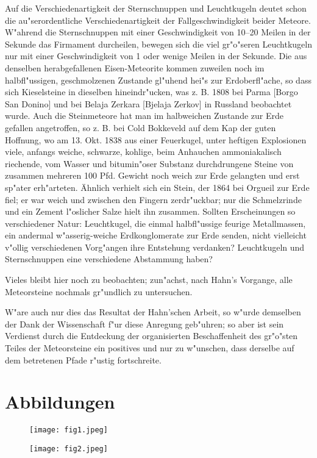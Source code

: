\documentclass[a4paper, 11pt, oneside]{article}
\begin{document}
Auf die Verschiedenartigkeit der Sternschnuppen und Leuchtkugeln deutet schon die au"serordentliche Verschiedenartigkeit der Fallgeschwindigkeit beider Meteore. W"ahrend die Sternschnuppen mit einer Geschwindigkeit von 10--20 Meilen in der Sekunde das Firmament durcheilen, bewegen sich die viel gr"o"seren Leuchtkugeln nur mit einer Geschwindigkeit von 1 oder wenige Meilen in der Sekunde. Die aus denselben herabgefallenen Eisen-Meteorite kommen zuweilen noch im halbfl"ussigen, geschmolzenen Zustande gl"uhend hei"s zur Erdoberfl"ache, so dass sich Kieselsteine in dieselben hineindr"ucken, was z. B. 1808 bei Parma [Borgo San Donino] und bei Belaja Zerkara [Bjelaja Zerkov] in Russland beobachtet wurde. Auch die Steinmeteore hat man im halbweichen Zustande zur Erde gefallen angetroffen, so z. B. bei Cold Bokkeveld auf dem Kap der guten Hoffnung, wo am 13. Okt. 1838 aus einer Feuerkugel, unter heftigen Explosionen viele, anfangs weiche, schwarze, kohlige, beim Anhauchen ammoniakalisch riechende, vom Wasser und bitumin"oser Substanz durchdrungene Steine von zusammen mehreren 100 Pfd. Gewicht noch weich zur Erde gelangten und erst sp"ater erh"arteten. Ähnlich verhielt sich ein Stein, der 1864 bei Orgueil zur Erde fiel; er war weich und zwischen den Fingern zerdr"uckbar; nur die Schmelzrinde und ein Zement l"oslicher Salze hielt ihn zusammen. Sollten Erscheinungen so verschiedener Natur: Leuchtkugel, die einmal halbfl"ussige feurige Metallmassen, ein andermal w"asserig-weiche Erdkonglomerate zur Erde senden, nicht vielleicht v"ollig verschiedenen Vorg"angen ihre Entstehung verdanken? Leuchtkugeln und Sternschnuppen eine verschiedene Abstammung haben?

Vieles bleibt hier noch zu beobachten; zun"achst, nach Hahn's Vorgange, alle Meteorsteine nochmals gr"undlich zu untersuchen.

W"are auch nur dies das Resultat der Hahn'schen Arbeit, so w"urde demselben der Dank der Wissenschaft f"ur diese Anregung geb"uhren; so aber ist sein Verdienst durch die Entdeckung der organisierten Beschaffenheit des gr"o"sten Teiles der Meteorsteine ein positives und nur zu w"unschen, dass derselbe auf dem betretenen Pfade r"ustig fortschreite.
\clearpage
\section{Abbildungen}
\clearpage
\pagestyle{fancy}
\fancyhf{}
\cfoot{\thepage}
\begin{figure}[t]
\texttt{[image: fig1.jpeg]}
\centering
\end{figure}
\clearpage
{}
\begin{figure}[t]
\centering
\texttt{[image: fig2.jpeg]}
\end{figure}
\clearpage
\end{document}
